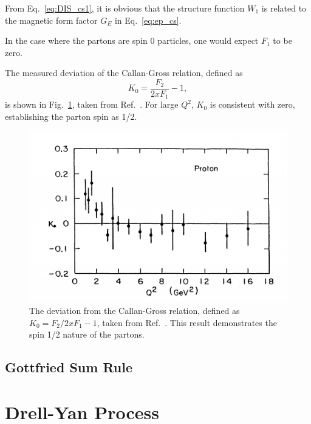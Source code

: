 From Eq.\ \ref{eq:DIS_cs1}, it is obvious that the structure function $W_1$ is 
related to the magnetic form factor $G_E$ in Eq.\ \ref{eq:ep_cs}. 

In the case where the partons are spin 0 particles, one would expect $F_1$ to 
be zero.

The measured deviation of the Callan-Gross relation, defined as 
\begin{equation}
K_0 = \frac{F_2}{2xF_1}-1,
\end{equation}
is shown in Fig.\ \ref{fig:callan_gross}, taken from Ref.\ \cite{kendall1991}. 
For large $Q^2$, $K_0$ is consistent with zero, establishing the parton spin as
1/2.
\begin{figure}
\centering
\includegraphics[width=0.5\linewidth]{images/Callan_Gross_relation}
\caption{The deviation from the Callan-Gross relation, defined as 
	$K_0=F_2/2xF_1 -1$, taken from Ref.\ \cite{kendall1991}. This result
	demonstrates the spin 1/2 nature of the partons.}
\label{fig:callan_gross}
\end{figure}


\subsection{Gottfried Sum Rule}
\label{sec:gottfried}

\section{Drell-Yan Process}
\label{sec:DY}

